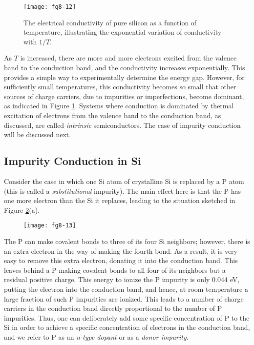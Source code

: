 \begin{figure}
\begin{center}
\texttt{[image: fg8-12]}
\end{center}
\caption{The electrical conductivity of pure silicon as a function of
temperature, illustrating the exponential variation of conductivity
with $1/T$.} 
\label{chap8-fig12}
\end{figure}

As $T$ is increased, there are more and more electrons excited from the 
valence band to the conduction band, and the conductivity increases 
exponentially.  This provides a simple way to experimentally determine 
the energy gap.  However, for sufficiently small temperatures, this
conductivity becomes so small that other sources of charge carriers, due to 
impurities or imperfections, become dominant, as indicated in Figure 
\ref{chap8-fig12}. Systems where conduction is dominated by thermal excitation of 
electrons from the valence band to the conduction band, as discussed,
are called {\it intrinsic} semiconductors. The case of impurity
conduction will be discussed next.

\subsection{Impurity Conduction in Si}

Consider the case in which one Si atom of crystalline Si is replaced
by a P atom (this is called a \emph{substitutional} impurity). The
main effect here is that the P has one more electron than the Si it
replaces, leading to the situation sketched in Figure
\ref{chap8-fig13}(a).

\begin{figure}
\begin{center}
\texttt{[image: fg8-13]}
\end{center}
\caption{}
\label{chap8-fig13}
\end{figure}

The P can make covalent bonds to three of its four Si neighbors;
however, there is an extra electron in the way of making the fourth
bond.  As a result, it is very easy to remove this extra electron,
donating it into the conduction band. This leaves behind a P making
covalent bonds to all four of its neighbors but a residual positive
charge. This energy to ionize the P impurity is only 0.044 eV, putting
the electron into the conduction band, and hence, at room temperature
a large fraction of such P impurities are ionized. This leads to a
number of charge carriers in the conduction band directly proportional
to the number of P impurities.  Thus, one can deliberately add some
specific concentration of P to the Si in order to achieve a specific
concentration of electrons in the conduction band, and we refer to P
as an \emph{n-type dopant} or as a \emph{donor impurity}.

